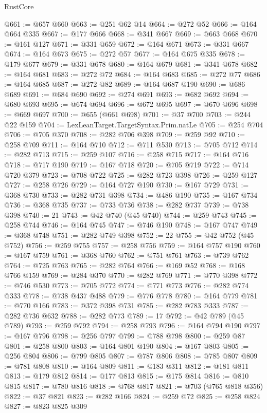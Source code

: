 \begin{lexlean}{RustCore}
\begin{coremodule}
@661 := @657 @660
@663 := @251 @62 @14
@664 := @272 @52
@666 := @164 @664 @335
@667 := @177 @666
@668 := @341 @667
@669 := @663 @668
@670 := @161 @127
@671 := @331 @659
@672 := @164 @671
@673 := @331 @667
@674 := @164 @673
@675 := @272 @57
@677 := @164 @675 @335
@678 := @179 @677
@679 := @331 @678
@680 := @164 @679
@681 := @341 @678
@682 := @164 @681
@683 := @272 @72
@684 := @164 @683
@685 := @272 @77
@686 := @164 @685
@687 := @272 @82
@689 := @164 @687 @190
@690 := @686 @689
@691 := @684 @690
@692 := @274 @691
@693 := @682 @692
@694 := @680 @693
@695 := @674 @694
@696 := @672 @695
@697 := @670 @696
@698 := @669 @697
@700 := @655 (@661 @698)
@701 := @37 @700
@703 := @244 @22 @159
@704 := LexLeanTarget.TargetSyntax.Prim.natLe
@705 := @254 @704
@706 := @705 @370
@708 := @282 @706 @398
@709 := @259 @92
@710 := @258 @709
@711 := @164 @710
@712 := @711 @530
@713 := @705 @712
@714 := @282 @713
@715 := @259 @107
@716 := @258 @715
@717 := @164 @716
@718 := @717 @190
@719 := @167 @718
@720 := @705 @719
@722 := @714 @720 @379
@723 := @708 @722
@725 := @282 @723 @398
@726 := @259 @127
@727 := @258 @726
@729 := @164 @727 @190
@730 := @167 @729
@731 := @368 @730
@733 := @282 @731 @398
@734 := @486 @190
@735 := @167 @734
@736 := @368 @735
@737 := @733 @736
@738 := @282 @737
@739 := @738 @398
@740 := 21
@743 := @42 @740 (@45 @740)
@744 := @259 @743
@745 := @258 @744
@746 := @164 @745
@747 := @746 @190
@748 := @167 @747
@749 := @368 @748
@751 := @282 @749 @398
@752 := 22
@755 := @42 @752 (@45 @752)
@756 := @259 @755
@757 := @258 @756
@759 := @164 @757 @190
@760 := @167 @759
@761 := @368 @760
@762 := @751 @761
@763 := @739 @762
@764 := @725 @763
@765 := @282 @764
@766 := @169 @52
@768 := @168 @766 @159
@769 := @284 @370
@770 := @282 @769
@771 := @770 @398
@772 := @746 @530
@773 := @705 @772
@774 := @771 @773
@776 := @282 @774 @333
@778 := @738 @437 @488
@779 := @776 @778
@780 := @164 @779
@781 := @770 @166
@783 := @372 @398 @731
@785 := @282 @783 @333
@787 := @282 @736 @632
@788 := @282 @773
@789 := 17
@792 := @42 @789 (@45 @789)
@793 := @259 @792
@794 := @258 @793
@796 := @164 @794 @190
@797 := @167 @796
@798 := @256 @797
@799 := @788 @798
@800 := @259 @87
@801 := @258 @800
@803 := @164 @801 @190
@804 := @167 @803
@805 := @256 @804
@806 := @799 @805
@807 := @787 @806
@808 := @785 @807
@809 := @781 @808
@810 := @164 @809
@811 := @183 @311
@812 := @181 @811
@813 := @179 @812
@814 := @177 @813
@815 := @175 @814
@816 := @810 @815
@817 := @780 @816
@818 := @768 @817
@821 := @703 (@765 @818 @356)
@822 := @37 @821
@823 := @282 @166
@824 := @259 @72
@825 := @258 @824
@827 := @823 @825 @309

\end{coremodule}
\end{lexlean}
